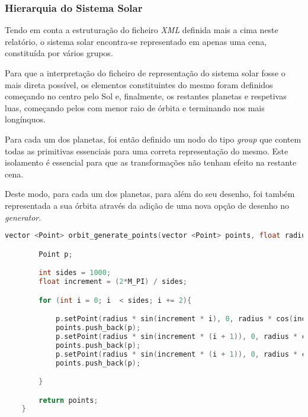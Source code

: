 \documentclass[a4paper]{article}
\begin{document}
\subsubsection{Hierarquia do Sistema Solar}

\hspace{3mm} Tendo em conta a estruturação do ficheiro \emph{XML} definida mais a cima neste relatório, o sistema solar encontra-se representado em apenas uma cena, constituída por vários grupos.

\par Para que a interpretação do ficheiro de representação do sistema solar fosse o mais direta possível, os elementos constituintes do mesmo foram definidos começando no centro pelo Sol e, finalmente, os restantes planetas e respetivas luas, começando pelos com menor raio de órbita e terminando nos mais longínquos.

\par Para cada um dos planetas, foi então definido um nodo do tipo \emph{group} que contem todas as primitivas essenciais para uma correta representação do mesmo. Este isolamento é essencial para que as transformações não tenham efeito na restante cena.

\par Deste modo, para cada um dos planetas, para além do seu desenho, foi também representada a sua órbita através da adição de uma nova opção de desenho no \emph{generator}.

\begin{lstlisting}[language=C++, caption=Algoritmo utilizado para a geração de uma órbita.]
    vector <Point> orbit_generate_points(vector <Point> points, float radius){

        Point p;

        int sides = 1000;
        float increment = (2*M_PI) / sides;

        for (int i = 0; i  < sides; i += 2){

            p.setPoint(radius * sin(increment * i), 0, radius * cos(increment * i));
            points.push_back(p);
            p.setPoint(radius * sin(increment * (i + 1)), 0, radius * cos(increment * (i + 1)));
            points.push_back(p);
            p.setPoint(radius * sin(increment * (i + 1)), 0, radius * cos(increment * (i + 2)));
            points.push_back(p);

        }

        return points;
    }
\end{lstlisting}
\end{document}
